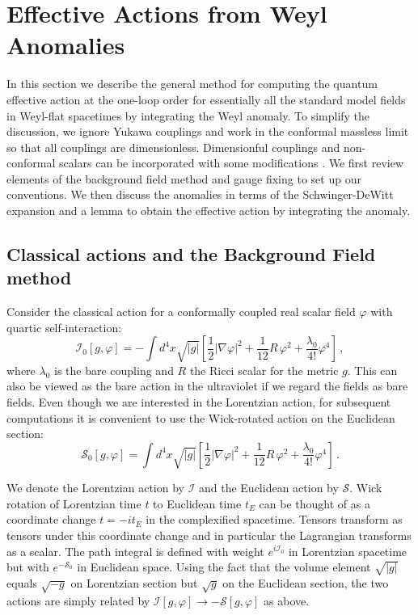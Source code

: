 \documentclass[12pt,a4paper]{article}
\newcommand{\be}{\begin{equation}}
\newcommand{\ee}{\end{equation}}
\newcommand{\cI}{\mathcal{I}}
\newcommand{\cS}{\mathcal{S}}
\renewcommand{\l}{\lambda}
\newcommand{\1}{{\textbf{1}}}
\newcommand{\+}{{\,+ \,}}
\begin{document}
\section{Effective Actions from Weyl Anomalies \label{Weyl}}

In this section we describe the general method for computing the quantum effective action at the one-loop order for essentially all the standard model fields in Weyl-flat spacetimes by integrating the Weyl anomaly. To simplify the discussion, we ignore Yukawa couplings and work  in the conformal massless limit so that all couplings are dimensionless. Dimensionful couplings and non-conformal scalars can be incorporated  with some modifications \cite{Benevides:2017a}.   We first review  elements of the background field method and gauge fixing  to set up our conventions. We then discuss the anomalies in terms of the Schwinger-DeWitt expansion and a lemma to obtain the effective action by integrating the anomaly.

\subsection{Classical actions and the Background Field method}

 Consider the classical  action for a conformally coupled real scalar field $\varphi$ with quartic self-interaction:
\be\label{c-action-scalar}
\cI_{0}[g, \varphi] = - \int d^{4}x \sqrt{|g|}  \left[  \frac{1 }{2} |\nabla \varphi |^{2}+ \frac{1}{12} R\, \varphi^{2}+ \frac{\l_{0}}{4!} \varphi^{4}   \right] \, ,
\ee 
where $\l_{0}$ is the bare coupling and $R$ the Ricci scalar for the metric $g$. This can also be viewed  as the bare action in the ultraviolet if we regard the fields as bare fields. 
Even though we are interested in the Lorentzian action, for subsequent computations it is convenient to use the Wick-rotated action  on the Euclidean section:
\be\label{c-action-scalar2}
\cS_{0}[g, \varphi] =  \int d^{4}x \sqrt{|g|}  \left[  \frac{1 }{2} |\nabla \varphi |^{2}+ \frac{1}{12} R\, \varphi^{2}+ \frac{\l_{0}}{4!} \varphi^{4}   \right] \, .
\ee 

We denote the Lorentzian action by $\cI$ and the Euclidean action by $\cS$. Wick rotation of Lorentzian time $t$ to Euclidean time $t_{E}$ can be thought of as a coordinate change  $t= -it_{E}$ in the complexified spacetime.  Tensors transform as tensors under this coordinate change and in particular the Lagrangian transforms as a scalar. The path integral is defined with  weight $e^{i\cI_{0}}$ in Lorentzian spacetime but  with $e^{-\cS_{0}}$ in Euclidean space.  Using the fact that the volume element $\sqrt{|g|}$ equals $\sqrt{-g}$ on Lorentzian section but $\sqrt{g}$ on the Euclidean section, the two actions are simply related by $\cI[g, \varphi] \rightarrow -\cS [g, \varphi]$ as above.
\end{document}
